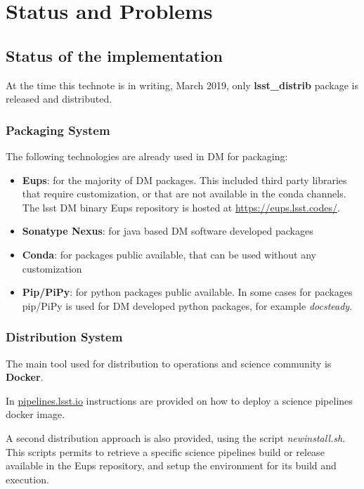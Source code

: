 \section{Status and Problems} \label{sec:statusAndProblems}

\subsection{Status of the implementation} \label{sec:status}

At the time this technote is in writing, March 2019, only \textbf{lsst\_distrib} package is released and distributed.


\subsubsection{Packaging System} \label{sec:statusPkgs}

The following technologies are already used in DM for packaging:

\begin{itemize}
\item {\bf Eups}: for the majority of DM packages. This included third party libraries that require customization, or that are not available in the conda channels. The lsst DM binary Eups repository is hosted at \url{https://eups.lsst.codes/}. 
\item {\bf Sonatype Nexus}: for java based DM software developed packages
\item {\bf Conda}: for packages public available, that can be used without any customization
\item {\bf Pip/PiPy}: for python packages public available. In some cases for packages pip/PiPy is used for DM developed python packages, for example \textit{docsteady}.
\end{itemize}


\subsubsection{Distribution System} \label{sec:statusDistrib}

The main tool used for distribution to operations and science community is \textbf{Docker}. 

In \url{pipelines.lsst.io} instructions are provided on how to deploy a science pipelines docker image.

A second distribution approach is also provided, using the script \textit{newinstall.sh}. 
This scripts permits to retrieve a specific science pipelines build or release available in the Eups repository, and setup the environment for its build and execution.


